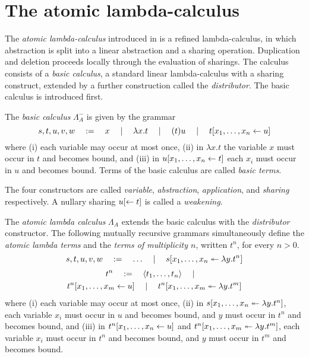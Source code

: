 \documentclass{llncs} %
\begin{document}
\section{The atomic lambda-calculus}
\label{sec:atomic-lambda-calculus}


The \emph{atomic lambda-calculus} introduced in \cite{Gundersen-Heijltjes-Parigot-2013-LICS} is a refined lambda-calculus, in which abstraction is split into a linear abstraction and a sharing operation.
%
Duplication and deletion proceeds locally through the evaluation of sharings.
%
The calculus consists of a \emph{basic calculus}, a standard linear lambda-calculus with a sharing construct, extended by a further construction called the \emph{distributor}.
%
The basic calculus is introduced first.


\begin{definition}
The \emph{basic calculus} $\Lambda_A^-$ is given by the grammar
%
\[
s,t,u,v,w  \quad\coloneq\quad x
	\mmid	\lambda x.t
	\mmid	(t)u
	\mmid	t\share xu
\]
%
where
(i) each variable may occur at most once,
(ii) in $\lambda x.t$ the variable $x$ must occur in $t$ and becomes bound, and
(iii) in $u\share xt$ each $x_i$ must occur in $u$ and becomes bound.
%
Terms of the basic calculus are called \emph{basic terms}.
\end{definition}
%
%
%
The four constructors are called \emph{variable}, \emph{abstraction}, \emph{application}, and \emph{sharing} respectively.
%
A nullary sharing $u\share*{}t$ is called a \emph{weakening}.



\begin{definition}
The \emph{atomic lambda calculus} $\Lambda_A$ extends the basic calculus with the \emph{distributor} constructor.
%
The following mutually recursive grammars simultaneously define the \emph{atomic lambda terms} and the \emph{terms of multiplicity $n$}, written $t^n$, for every $n>0$.
%
\[
	s,t,u,v,w  \quad\coloneq\quad \ldots \mmid s\distr xy{t^n}
\]
\begin{multline*}
	t^n \quad\coloneq\quad \tup t\mmid \\
	t^n\share[m]xu \mmid t^n\distr[m]xy{t^m}
\end{multline*}
%
where
(i) each variable may occur at most once,
(ii) in $s\distr xy{t^n}$, each variable $x_i$ must occur in $u$ and becomes bound, and $y$ must occur in $t^n$ and becomes bound, and
(iii) in $t^n\share xu$ and $t^n\distr[m]xy{t^m}$, each variable $x_i$ must occur in $t^n$ and becomes bound, and $y$ must occur in $t^m$ and becomes bound.

\end{definition}
\end{document}
